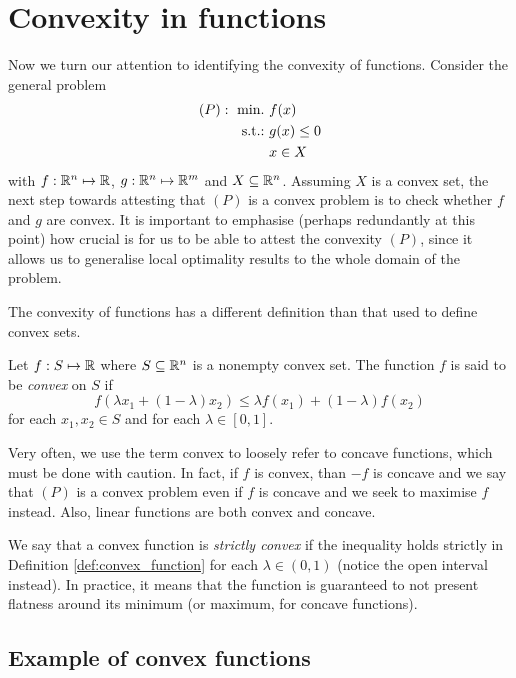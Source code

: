 \section{Convexity in functions}

Now we turn our attention to identifying the convexity of functions. Consider the general problem
%
\begin{align*}
	(P) :~ \mathop{\text{min.~}} & f(x) \\
	\mathop{\text{s.t.:~}}          & g(x) \leq 0 \\
    	         & x \in X  
\end{align*}
% 
with $f:\mathbb{R}^n \mapsto \mathbb{R}$, $g: \mathbb{R}^n \mapsto \mathbb{R}^m$ and $X \subseteq \mathbb{R}^n$. Assuming $X$ is a convex set, the next step towards attesting that $(P)$ is a convex problem is to check whether $f$ and $g$ are convex. It is important to emphasise (perhaps redundantly at this point) how crucial is for us to be able to attest the convexity $(P)$, since it allows us to generalise local optimality results to the whole domain of the problem.

The convexity of functions has a different definition than that used to define convex sets.
%
\begin{definition}\label{def:convex_function}
	Let $f:S \mapsto \mathbb{R}$ where $S \subseteq \mathbb{R}^n$ is a nonempty convex set. The function $f$ is said to be \emph{convex} on $S$ if
	$$ f(\lambda x_1 + (1-\lambda)x_2) \leq \lambda f(x_1) + (1-\lambda)f(x_2)
	$$
	for each $x_1, x_2 \in S$ and for each $\lambda \in [0,1]$.
\end{definition}
%
Very often, we use the term convex to loosely refer to  concave functions, which must be done with caution. In fact, if $f$ is convex, than $-f$ is concave and we say that $(P)$ is a convex problem even if $f$ is concave and we seek to maximise $f$ instead. Also, linear functions are both convex and concave. 

We say that a convex function is \emph{strictly convex} if the inequality holds strictly in Definition \ref{def:convex_function} for each $\lambda \in (0,1)$ (notice the open interval instead). In practice, it means that the function is guaranteed to not present flatness around its minimum (or maximum, for concave functions).

\subsection{Example of convex functions}

